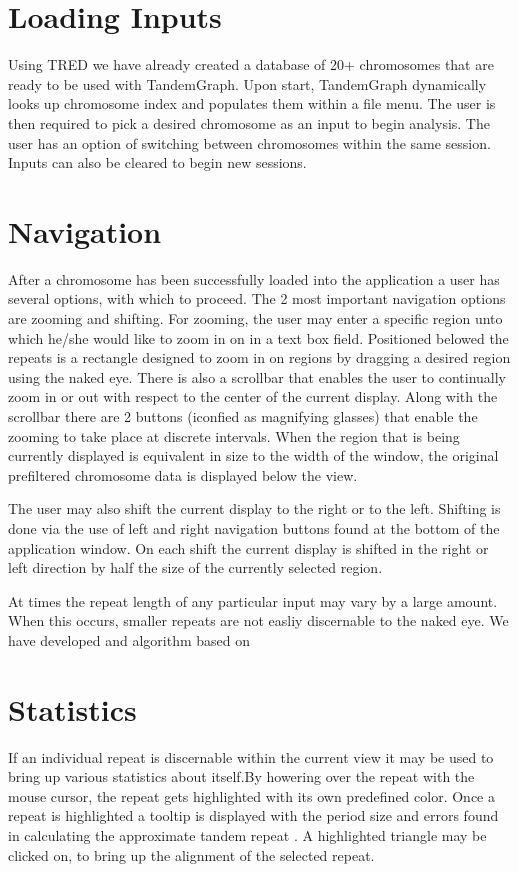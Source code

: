 \documentclass[a4paper, 12pt]{article}
\begin{document}
\section{Loading Inputs}
Using TRED we have already created a database of 20+ chromosomes that are ready to be used with TandemGraph. Upon start, TandemGraph dynamically looks up chromosome index and populates them within a file menu. The user is then required to pick a desired chromosome as an input to begin analysis. The user has an option of switching between chromosomes within the same session. Inputs can also be cleared to begin new sessions.

\section{Navigation}
After a chromosome has been successfully loaded into the application a user has several options, with which to proceed. The 2 most important navigation options are zooming and shifting. For zooming, the user may enter a specific region unto which he/she would like to zoom in on in a text box field. Positioned belowed the repeats is a rectangle designed to zoom in on regions by dragging a desired region using the naked eye. There is also a scrollbar that enables the user to continually zoom in or out with respect to the center of the current display. Along with the scrollbar there are 2 buttons (iconfied as magnifying glasses) that enable the zooming to take place at discrete intervals. When the region that is being currently displayed is equivalent in size to the width of the window, the original prefiltered chromosome data is displayed below the view.

The user may also shift the current display to the right or to the left. Shifting is done via the use of left and right navigation buttons found at the bottom of the application window. On each shift the current display is shifted in the right or left direction by half the size of the currently selected region.

At times the repeat length of any particular input may vary by a large amount. When this occurs, smaller repeats are not easliy discernable to the naked eye. We have developed and algorithm based on

\section{Statistics}
If an individual repeat is discernable within the current view it may be used to bring up various statistics about itself.By howering over the repeat with the mouse cursor, the repeat gets highlighted with its own predefined color. Once a repeat is highlighted a tooltip is displayed with the period size and errors found in calculating the approximate tandem repeat \cite{tred1,tred2}. A highlighted triangle may be clicked on, to bring up the alignment of the selected repeat.
\end{document}
